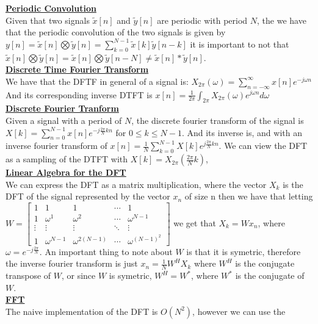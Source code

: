 \documentclass[9pt]{article}
\author{Lawrence Liu}
\begin{document}

\underline{\textbf{Periodic Convolution}}\\
Given that two signals $\tilde{x}[n]$ and $\tilde{y}[n]$
 are periodic with period $N$, the we have that the periodic
    convolution of the two signals is given by
    $\boxed{y[n]=\tilde{x}[n]\bigotimes\tilde{y}[n]
    =\sum_{k=0}^{N-1}\tilde{x}[k]\tilde{y}[n-k]}$ it is important 
    to not that 
    $\tilde{x}[n]\bigotimes\tilde{y}[n]=\tilde{x}[n]\bigotimes\tilde{y}[n-N]\neq
    \tilde{x}[n]*\tilde{y}[n]$.\\
\underline{\textbf{Discrete Time Fourier Transform}}\\
We have that the DFTF in general of a signal is: $X_{2\pi}(\omega) =\sum_{n=-\infty}^{\infty}x[n]e^{-j\omega n}$
And its corresponding inverse DTFT is $x[n] = \frac{1}{2\pi}\int_{2\pi}X_{2\pi}(\omega)e^{j\omega n}d\omega$\\
\underline{\textbf{Discrete Fourier Tranform}}\\
Given a signal with a period of $N$, the discrete fourier transform of the signal is 
$X[k]=\sum_{n=0}^{N-1}x[n]e^{-j\frac{2\pi}{N}kn}$ for $0\leq k\leq N-1$. And its inverse is, and with an inverse fourier transform of
$x[n]=\frac{1}{N}\sum_{k=0}^{N-1}X[k]e^{j\frac{2\pi}{N}kn}$. We can 
view the DFT as a sampling of the DTFT with $X[k]=X_{2\pi}(\frac{2\pi}{N}k)$,\\
\underline{\textbf{Linear Algebra for the DFT}}\\
We can express the DFT as a matrix multiplication, where
the vector $X_k$ is the DFT of the signal represented by the vector $x_n$
of size n then we have that letting $W=\begin{bmatrix}
    1 & 1 & 1 & \cdots & 1 \\
    1 & \omega^{1} & \omega^{2} & \cdots & \omega^{N-1} \\
    \vdots & \vdots & \vdots & \ddots & \vdots \\
    1 & \omega^{N-1} & \omega^{2(N-1)} & \cdots & \omega^{(N-1)^2}
\end{bmatrix}$ we get that
$\boxed{X_k=Wx_n}$, where $\omega=e^{-j\frac{2\pi}{N}}$. An important thing to note about $W$ is that it 
is symetric, therefore the inverse fourier transform is just 
$\boxed{x_n=\frac{1}{N}W^H X_k}$
where $W^H$ is the conjugate transpose of $W$, or since 
$W$ is symetric, $W^H=W^*$, where $W^*$ is the conjugate of $W$.\\
\underline{\textbf{FFT}}\\
The naive implementation of the DFT is $O(N^2)$, however we can use the
\end{document}
